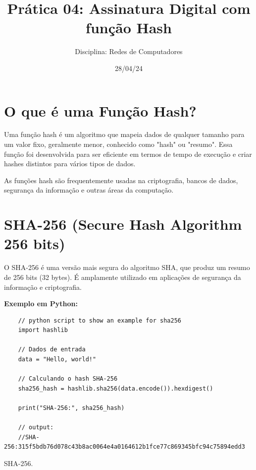\documentclass[a4paper,12pt]{article}
\title{ \textbf{\large Pr\'atica 04: Assinatura Digital com fun\c{c}\~ao Hash}}
\author{Disciplina: Redes de Computadores}
\date{28/04/24}
\begin{document}
\maketitle




\section{O que é uma Função Hash?}
\hspace{0.5cm}Uma função hash é um algoritmo que mapeia dados de 
qualquer tamanho para um valor fixo, geralmente menor, conhecido como 
"hash" ou "resumo". Essa função foi desenvolvida para ser eficiente em 
termos de tempo de execução e criar hashes distintos para vários tipos 
de dados.

As funções hash são frequentemente usadas na criptografia, bancos de 
dados, segurança da informação e outras áreas da computação.

\section{SHA-256 (Secure Hash Algorithm 256 bits)}
\hspace{0.5cm}O SHA-256 é uma versão mais segura do algoritmo SHA, que 
produz um resumo de 256 bits (32 bytes). É amplamente utilizado em aplicações 
de segurança da informação e criptografia.

\textbf{Exemplo em Python:}

\begin{listing}[!ht]
    \begin{verbatim}
    // python script to show an example for sha256
    import hashlib

    // Dados de entrada
    data = "Hello, world!"

    // Calculando o hash SHA-256
    sha256_hash = hashlib.sha256(data.encode()).hexdigest()

    print("SHA-256:", sha256_hash)

    // output:
    //SHA-256:315f5bdb76d078c43b8ac0064e4a0164612b1fce77c869345bfc94c75894edd3
    \end{verbatim}
    \caption{SHA-256.}
    \label{listing:2}
\end{listing}
\end{document}
